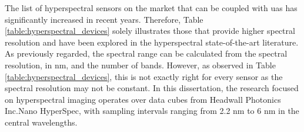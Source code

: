 The list of hyperspectral sensors on the market that can be coupled with \acrshort{uas} has significantly increased in recent years. Therefore, Table \ref{table:hyperspectral_devices} solely illustrates those that provide higher spectral resolution and have been explored in the hyperspectral state-of-the-art literature. As previously regarded, the spectral range can be calculated from the spectral resolution, in \si{\nano\meter}, and the number of bands. However, as observed in Table \ref{table:hyperspectral_devices}, this is not exactly right for every sensor as the spectral resolution may not be constant. In this dissertation, the research focused on hyperspectral imaging operates over data cubes from Headwall Photonics Inc.\textregistered Nano HyperSpec, with sampling intervals ranging from 2.2 \si{\nano\meter} to 6 \si{\nano\meter} in the central wavelengths.

